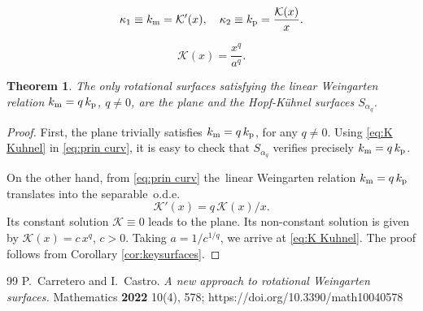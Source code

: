 \documentclass[10pt,a4paper]{amsart}
\newtheorem{theorem}{Theorem}
\begin{document}
\begin{equation}\label{eq:prin curv}
	\kappa_1\equiv k_{\text m}= \mathcal K ' (x), \quad \kappa_2\equiv k_{\text p}= \frac{\mathcal K (x)}{x}.
\end{equation}

\begin{equation}\label{eq:K Kuhnel}
	\mathcal K (x)= \frac{x^q}{a^q}.
\end{equation}

	\begin{theorem}\label{Th:Kuhnel}
		The only rotational surfaces satisfying the linear Weingarten relation $k_{\text m} = q\,  k_{\text p}$, $q\neq 0$, are the plane and the Hopf-Kühnel surfaces $S_{\alpha_q}$.
	\end{theorem}

	\begin{proof}
		First, the plane trivially satisfies $k_{\text m} = q\,  k_{\text p}$, for any $q\neq 0$. Using \eqref{eq:K Kuhnel} in \eqref{eq:prin curv}, it is easy to check that $S_{\alpha_q}$ verifies precisely $k_{\text m} = q\,  k_{\text p}$.
		
		On the other hand, from \eqref{eq:prin curv} 
		the~linear Weingarten relation $k_{\text m}=q\,  k_{\text p}$ translates into the separable~o.d.e.
		$$\mathcal K ' (x)=q\, \mathcal K(x)/x. $$
		Its constant solution $\mathcal K \equiv 0$ leads to the plane.
		Its non-constant solution is given by $\mathcal K (x)= c \, x^q$, $c>0$. Taking $a=1/c^{1/q}$, we arrive at \eqref{eq:K Kuhnel}. The proof follows from Corollary \ref{cor:keysurfaces}.
	\end{proof}	

\begin{thebibliography}{99}
 P.~Carretero and I.~Castro. {\em A new approach to rotational Weingarten surfaces.} Mathematics {\bf 2022} 10(4), 578; https://doi.org/10.3390/math10040578
\end{thebibliography}
\end{document}
